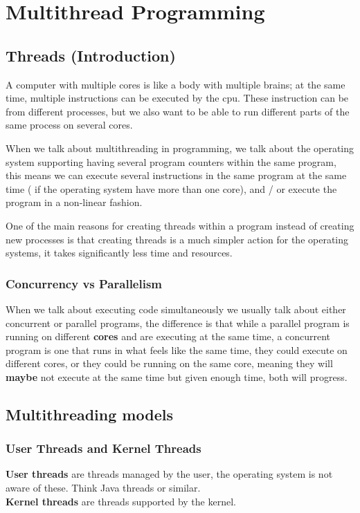 \chapter{Multithread Programming}

\section{Threads (Introduction)}
A computer with multiple cores is like a body with multiple brains; at the same time, multiple instructions can be executed by the cpu. These instruction can be from different processes, but we also want to be able to run different parts of the same process on several cores.

When we talk about multithreading in programming, we talk about the operating system supporting having several program counters within the same program, this means we can execute several instructions in the same program at the same time ( if the operating system have more than one core), and / or execute the program in a non-linear fashion.

One of the main reasons for creating threads within a program instead of creating new processes is that creating threads is a much simpler action for the operating systems, it takes significantly less time and resources.

\subsection{Concurrency vs Parallelism}
When we talk about executing code simultaneously we usually talk about either concurrent or parallel programs, the difference is that while a parallel program is running on different \textbf{cores} and are executing at the same time, a concurrent program is one that runs in what feels like the same time, they could execute on different cores, or they could be running on the same core, meaning they will \textbf{maybe} not execute at the same time but given enough time, both will progress.



\section{Multithreading models}

\subsection{User Threads and Kernel Threads}
\textbf{User threads} are threads managed by the user, the operating system is not aware of these. Think Java threads or similar.\\
\textbf{Kernel threads} are threads supported by the kernel.

